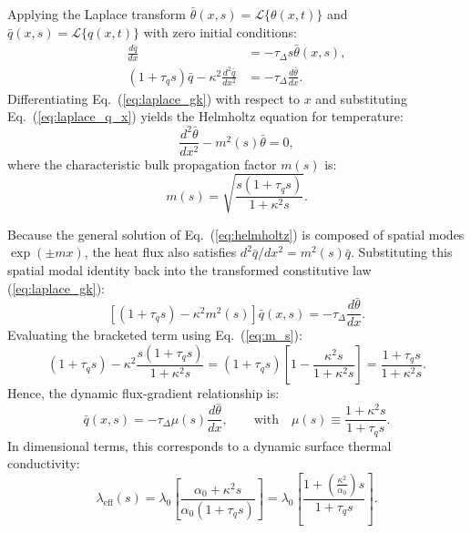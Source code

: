 \documentclass[review,12pt]{article}
\begin{document}
Applying the Laplace transform $\bar{\theta}(x, s) = \mathcal{L}\{\theta(x, t)\}$ and $\bar{q}(x, s) = \mathcal{L}\{q(x, t)\}$ with zero initial conditions:
\begin{align}
\frac{d\bar{q}}{dx} &= -\tau_\Delta s \bar{\theta}(x, s), \label{eq:laplace_q_x} \\
(1 + \tau_q s)\bar{q} - \kappa^2 \frac{d^2\bar{q}}{dx^2} &= -\tau_\Delta \frac{d\bar{\theta}}{dx}. \label{eq:laplace_gk}
\end{align}
Differentiating Eq.~(\ref{eq:laplace_gk}) with respect to $x$ and substituting Eq.~(\ref{eq:laplace_q_x}) yields the Helmholtz equation for temperature:
\begin{equation}
\frac{d^2\bar{\theta}}{dx^2} - m^2(s)\bar{\theta} = 0,
\label{eq:helmholtz}
\end{equation}
where the characteristic bulk propagation factor $m(s)$ is:
\begin{equation}
m(s) = \sqrt{\frac{s(1 + \tau_q s)}{1 + \kappa^2 s}}.
\label{eq:m_s}
\end{equation}

Because the general solution of Eq.~(\ref{eq:helmholtz}) is composed of spatial modes $\exp(\pm m x)$, the heat flux also satisfies $d^2\bar{q}/dx^2 = m^2(s)\bar{q}$. Substituting this spatial modal identity back into the transformed constitutive law (\ref{eq:laplace_gk}):
\begin{equation}
\left[(1 + \tau_q s) - \kappa^2 m^2(s)\right]\bar{q}(x, s) = -\tau_\Delta \frac{d\bar{\theta}}{dx}.
\end{equation}
Evaluating the bracketed term using Eq.~(\ref{eq:m_s}):
\begin{equation}
(1 + \tau_q s) - \kappa^2 \frac{s(1 + \tau_q s)}{1 + \kappa^2 s} = (1 + \tau_q s)\left[1 - \frac{\kappa^2 s}{1 + \kappa^2 s}\right] = \frac{1 + \tau_q s}{1 + \kappa^2 s}.
\end{equation}
Hence, the dynamic flux-gradient relationship is:
\begin{equation}
\bar{q}(x, s) = -\tau_\Delta \mu(s) \frac{d\bar{\theta}}{dx}, \qquad \text{with} \quad \mu(s) \equiv \frac{1 + \kappa^2 s}{1 + \tau_q s}.
\label{eq:dynamic_flux}
\end{equation}
In dimensional terms, this corresponds to a dynamic surface thermal conductivity:
\begin{equation}
\lambda_{\mathrm{eff}}(s) = \lambda_0 \left[ \frac{\alpha_0 + \kappa^2 s}{\alpha_0 (1 + \tau_q s)} \right] = \lambda_0 \left[\frac{1 + \left(\frac{\kappa^2}{\alpha_0}\right)s}{1 + \tau_q s}\right].
\label{eq:lambda_eff}
\end{equation}
\end{document}
